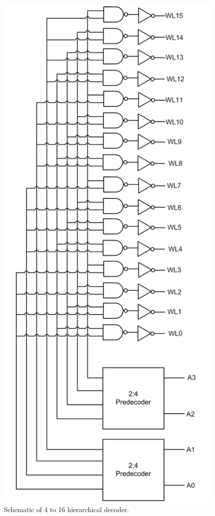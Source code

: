 \begin{figure}[h!]
\centering
\includegraphics[scale=.6]{./figs/4t16decoder.pdf}
\caption{Schematic of 4 to 16 hierarchical decoder.}
\label{fig:4 to 16 decoder}
\end{figure}

